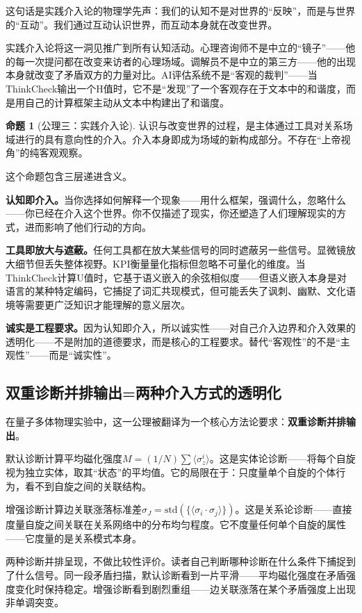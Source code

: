 \documentclass[11pt,a4paper]{book}
\theoremstyle{definition}
\newtheorem{proposition}{命题}[chapter]
\begin{document}
这句话是实践介入论的物理学先声：我们的认知不是对世界的“反映”，而是与世界的“互动”。我们通过互动认识世界，而互动本身就在改变世界。

实践介入论将这一洞见推广到所有认知活动。心理咨询师不是中立的“镜子”——他的每一次提问都在改变来访者的心理场域。调解员不是中立的第三方——他的出现本身就改变了矛盾双方的力量对比。AI评估系统不是“客观的裁判”——当ThinkCheck输出一个H值时，它不是“发现”了一个客观存在于文本中的和谐度，而是用自己的计算框架主动从文本中构建出了和谐度。

\begin{proposition}[公理三：实践介入论]
认识与改变世界的过程，是主体通过工具对关系场域进行的具有意向性的介入。介入本身即成为场域的新构成部分。不存在“上帝视角”的纯客观观察。
\end{proposition}

这个命题包含三层递进含义。

\textbf{认知即介入。}当你选择如何解释一个现象——用什么框架，强调什么，忽略什么——你已经在介入这个世界。你不仅描述了现实，你还塑造了人们理解现实的方式，进而影响了他们行动的方向。

\textbf{工具即放大与遮蔽。}任何工具都在放大某些信号的同时遮蔽另一些信号。显微镜放大细节但丢失整体视野。KPI衡量量化指标但忽略不可量化的维度。当ThinkCheck计算U值时，它基于语义嵌入的余弦相似度——但语义嵌入本身是对语言的某种特定编码，它捕捉了词汇共现模式，但可能丢失了讽刺、幽默、文化语境等需要更广泛知识才能理解的意义层次。

\textbf{诚实是工程要求。}因为认知即介入，所以诚实性——对自己介入边界和介入效果的透明化——不是附加的道德要求，而是核心的工程要求。替代“客观性”的不是“主观性”——而是“诚实性”。

\subsection{双重诊断并排输出=两种介入方式的透明化}

在量子多体物理实验中，这一公理被翻译为一个核心方法论要求：\textbf{双重诊断并排输出}。

默认诊断计算平均磁化强度$M=(1/N)\sum\langle\sigma_z^i\rangle$。这是实体论诊断——将每个自旋视为独立实体，取其“状态”的平均值。它的局限在于：只度量单个自旋的个体行为，看不到自旋之间的关联结构。

增强诊断计算边关联涨落标准差$\sigma_J=\text{std}(\{\langle\sigma_i\cdot\sigma_j\rangle\})$。这是关系论诊断——直接度量自旋之间关联在关系网络中的分布均匀程度。它不度量任何单个自旋的属性——它度量的是关系模式本身。

两种诊断并排呈现，不做比较性评价。读者自己判断哪种诊断在什么条件下捕捉到了什么信号。同一段矛盾扫描，默认诊断看到一片平滑——平均磁化强度在矛盾强度变化时保持稳定。增强诊断看到剧烈重组——边关联涨落在某个矛盾强度上出现非单调突变。
\end{document}
